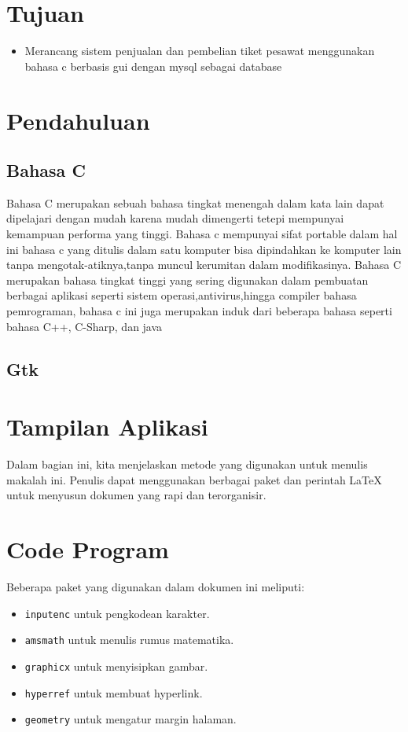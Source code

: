 \documentclass[a4paper,12pt]{report}
\begin{document}
\section{Tujuan}
\label{sec:intro}

\begin{itemize}
    \item  Merancang sistem penjualan dan pembelian tiket pesawat menggunakan bahasa c berbasis gui dengan mysql sebagai database
\end{itemize}

\section{Pendahuluan}
\subsection{Bahasa C}

Bahasa C merupakan sebuah bahasa tingkat menengah dalam kata lain dapat dipelajari dengan mudah karena mudah dimengerti tetepi mempunyai kemampuan performa yang tinggi. Bahasa c mempunyai sifat portable dalam hal ini bahasa c yang ditulis dalam satu komputer bisa dipindahkan ke komputer lain tanpa mengotak-atiknya,tanpa muncul kerumitan dalam modifikasinya.
Bahasa C merupakan bahasa tingkat tinggi yang sering digunakan dalam pembuatan berbagai aplikasi seperti sistem operasi,antivirus,hingga compiler bahasa pemrograman, bahasa c ini juga merupakan induk dari beberapa bahasa seperti bahasa C++, C-Sharp, dan java

\subsection{Gtk}
\section{Tampilan Aplikasi}

Dalam bagian ini, kita menjelaskan metode yang digunakan untuk menulis makalah ini. Penulis dapat menggunakan berbagai paket dan perintah LaTeX untuk menyusun dokumen yang rapi dan terorganisir.

\section{Code Program}
Beberapa paket yang digunakan dalam dokumen ini meliputi:
\begin{itemize}
    \item \texttt{inputenc} untuk pengkodean karakter.
    \item \texttt{amsmath} untuk menulis rumus matematika.
    \item \texttt{graphicx} untuk menyisipkan gambar.
    \item \texttt{hyperref} untuk membuat hyperlink.
    \item \texttt{geometry} untuk mengatur margin halaman.
\end{itemize}
\end{document}

